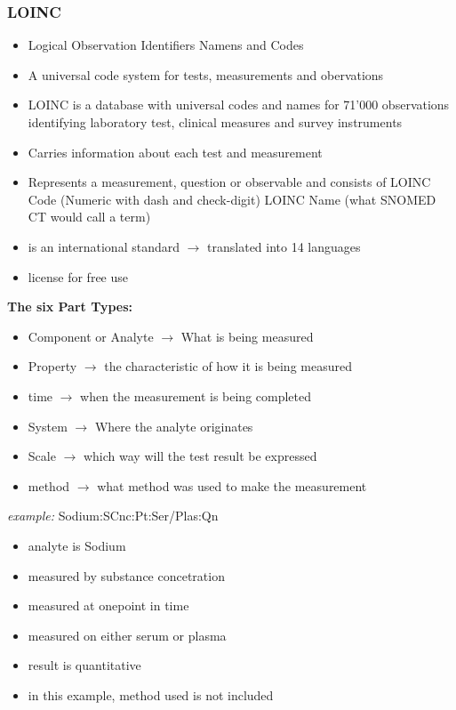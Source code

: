 \documentclass{report}
\theoremstyle{definition}
\theoremstyle{example}
\begin{document}
\subsubsection{LOINC}
\begin{itemize}
   \item Logical Observation Identifiers Namens and Codes
   \item A universal code system for tests, measurements and obervations
   \item LOINC is a database with universal codes and names for 71'000 observations identifying laboratory test, clinical measures and survey instruments
   \item Carries information about each test and measurement
   \item Represents a measurement, question or observable and consists of
   \subitem LOINC Code (Numeric with dash and check-digit)
   \subitem LOINC Name (what SNOMED CT would call a term) 
   \item is an international standard $\rightarrow$ translated into 14 languages
   \item license for free use
\end{itemize}

\textbf{The six Part Types:}
\begin{itemize}
   \item Component or Analyte $\rightarrow$ What is being measured
   \item Property $\rightarrow$ the characteristic of how it is being measured
   \item time $\rightarrow$ when the measurement is being completed
   \item System $\rightarrow$ Where the analyte originates
   \item Scale $\rightarrow$ which way will the test result be expressed
   \item method $\rightarrow$ what method was used to make the measurement
\end{itemize}
\textit{example:} Sodium:SCnc:Pt:Ser/Plas:Qn \\
\begin{itemize}
   \item analyte is Sodium
   \item measured by substance concetration
   \item measured at onepoint in time
   \item measured on either serum or plasma
   \item result is quantitative
   \item in this example, method used is not included
\end{itemize}
\end{document}
